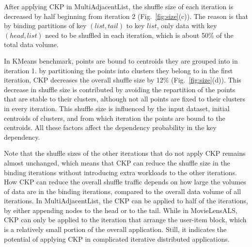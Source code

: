 \documentclass[10pt,journal,compsoc]{IEEEtran}
\begin{document}
After applying CKP in MultiAdjacentList, the shuffle size of each iteration is decreased by half beginning from iteration 2 (Fig.~\ref{fig:size}(c)). 
The reason is that by binding partitions of key $(list, tail)$ 
to key $list$, only data with key $(head, list)$ need to be shuffled in each iteration, which is about 50\% of the total data volume. 

In KMeans benchmark, points are bound to centroids they are grouped into in iteration 1. by partitioning the points into clusters they belong to in the first iteration, CKP decreases the overall shuffle size by 12\% (Fig.~\ref{fig:size}(d)). 
This decrease in shuffle size is contributed by avoiding the repartition of the points that are stable to their clusters,
although not all points are fixed to their clusters in every iteration. 
This shuffle size is influenced by the input dataset, initial 
centroids of clusters, and from which iteration the points are bound to the centroids.
All these factors affect the dependency probability in the key dependency.

Note that the shuffle sizes of the other iterations that do not apply CKP remains almost unchanged, which means that CKP can reduce the shuffle size in the binding iterations without introducing extra workloads to the other iterations. 
How CKP can reduce the overall shuffle traffic depends on how large the volumes
of data are in the binding iterations, 
compared to the overall data volume of all iterations. 
In MultiAdjacentList, the CKP can be applied to half of the iterations, by either appending nodes to the head or to the tail.
While in MovieLensALS, CKP can only be applied to the iteration that arrange the user-item block, which is a relatively small portion of the overall application. 
Still, it indicates the potential of applying CKP in complicated iterative distributed applications. 


\end{document}
